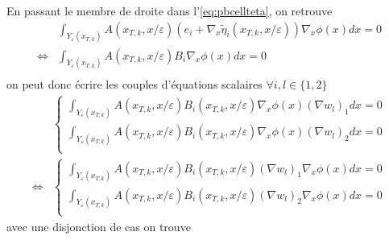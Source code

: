 \documentclass[11pt]{article}
\newcommand{\teta}{\tilde{\eta}}
\newcommand{\Ye}{Y_\varepsilon}
\begin{document}
En passant le membre de droite dans l'\autoref{eq:pbcellteta}, on retrouve
\begin{equation}
  \begin{aligned}
    &\int_{\Ye(x_{T,k})} A(x_{T,k}, x/\varepsilon)(e_i + \nabla_x \teta_i(x_{T,k}, x/\varepsilon)) \nabla_x \phi(x) dx = 0 \\
    \iff &\int_{\Ye(x_{T,k})} A(x_{T,k}, x/\varepsilon)B_i \nabla_x \phi(x) dx = 0 \\
  \end{aligned}
\end{equation}
on peut donc écrire les couples d'équations scalaires $\forall i,l \in \{1,2\}$ 
\begin{equation}
  \begin{aligned}
    &\begin{cases}
      \int_{\Ye(x_{T,k})} A(x_{T,k}, x/\varepsilon) B_i(x_{T,k}, x/\varepsilon) \nabla_x \phi(x) (\nabla w_l)_1 dx = 0 \\
      \int_{\Ye(x_{T,k})} A(x_{T,k}, x/\varepsilon) B_i(x_{T,k}, x/\varepsilon) \nabla_x \phi(x) (\nabla w_l)_2 dx = 0 \\ 
    \end{cases}   \\                     
    \iff &\begin{cases}                          
      \int_{\Ye(x_{T,k})} A(x_{T,k}, x/\varepsilon) B_i(x_{T,k}, x/\varepsilon) (\nabla w_l)_1 \nabla_x \phi(x) dx = 0 \\
      \int_{\Ye(x_{T,k})} A(x_{T,k}, x/\varepsilon) B_i(x_{T,k}, x/\varepsilon) (\nabla w_l)_2 \nabla_x \phi(x) dx = 0 \\ 
    \end{cases}
  \end{aligned}
\end{equation}
avec une disjonction de cas on trouve
\end{document}
